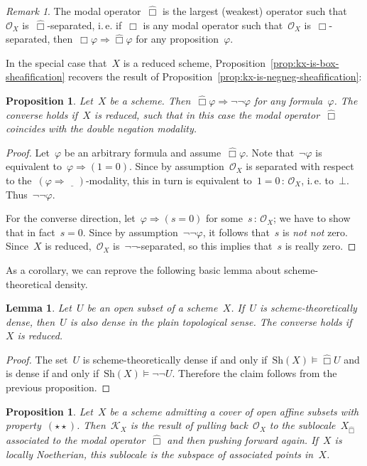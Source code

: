 \documentclass[10pt]{amsart}
\makeatletter
\theoremstyle{definition}
\theoremstyle{plain}
\newtheorem{prop}[defn]{Proposition}
\newtheorem{lemma}[defn]{Lemma}
\theoremstyle{remark}
\newtheorem{rem}[defn]{Remark}
\renewcommand{\O}{\mathcal{O}}
\newcommand{\K}{\mathcal{K}}
\newcommand{\placeholder}{\underline{\quad}}
\newcommand{\Sh}{\mathrm{Sh}}
\newcommand{\?}{\,{:}\,}
\renewcommand{\_}{\mathpunct{.}\,}
\newcommand{\sdense}{{\widehat\Box}}
\newcommand{\sdenseother}{\Box}
\newcommand{\ie}{i.\,e.\@\xspace}
\newcommand{\notnot}{\emph{not not}\xspace}
\makeatother
\begin{document}
\begin{rem}The modal operator~$\sdense$ is the largest (weakest) operator such
that~$\O_X$ is~$\sdense$-separated, \ie if~$\sdenseother$ is any modal operator
such that~$\O_X$ is~$\sdenseother$-separated, then~$\sdenseother\varphi
\Rightarrow \sdense\varphi$ for any proposition~$\varphi$.\end{rem}

In the special case that~$X$ is a reduced scheme,
Proposition~\ref{prop:kx-is-box-sheafification} recovers
the result of Proposition~\ref{prop:kx-is-negneg-sheafification}:

\begin{prop}Let~$X$ be a scheme. Then~$\sdense\varphi \Rightarrow \neg\neg\varphi$
for any formula~$\varphi$. The converse holds if~$X$ is reduced, such that in
this case the modal operator~$\sdense$ coincides with the double negation modality.\end{prop}
\begin{proof}Let~$\varphi$ be an arbitrary formula and assume~$\sdense\varphi$. Note that~$\neg\varphi$ is
equivalent to~$\varphi \Rightarrow (1 =
0)$. Since by assumption~$\O_X$ is separated with respect to the~$(\varphi
\Rightarrow \placeholder)$-modality, this in turn is equivalent to~$1 = 0 \?
\O_X$, \ie to~$\bot$. Thus~$\neg\neg\varphi$.

For the converse direction, let~$\varphi \Rightarrow (s = 0)$ for some~$s\?\O_X$;
we have to show that in fact~$s = 0$. Since by assumption~$\neg\neg\varphi$, it
follows that~$s$ is \notnot zero. Since~$X$ is reduced,~$\O_X$
is~$\neg\neg$-separated, so this implies that~$s$ is really zero.
\end{proof}

As a corollary, we can reprove the following basic lemma about
scheme-theoretical density.
\begin{lemma}Let~$U$ be an open subset of a scheme~$X$. If~$U$ is
scheme-theoretically dense, then~$U$ is also dense in the plain topological
sense. The converse holds if~$X$ is reduced.\end{lemma}
\begin{proof}The set~$U$ is scheme-theoretically dense if and only if~$\Sh(X)
\models \sdense U$ and is dense if and only if~$\Sh(X) \models \neg\neg U$.
Therefore the claim follows from the previous proposition.
\end{proof}

\begin{prop}\label{prop:kx-ass}
Let~$X$ be a scheme admitting a cover of open affine subsets with
property~$(\star\star)$. Then~$\K_X$ is the result of
pulling back~$\O_X$ to the sublocale~$X_\sdense$ associated to the modal
operator~$\sdense$ and then pushing forward again. If~$X$ is locally Noetherian,
this sublocale is the subspace of associated points in~$X$.
\end{prop}
\end{document}
